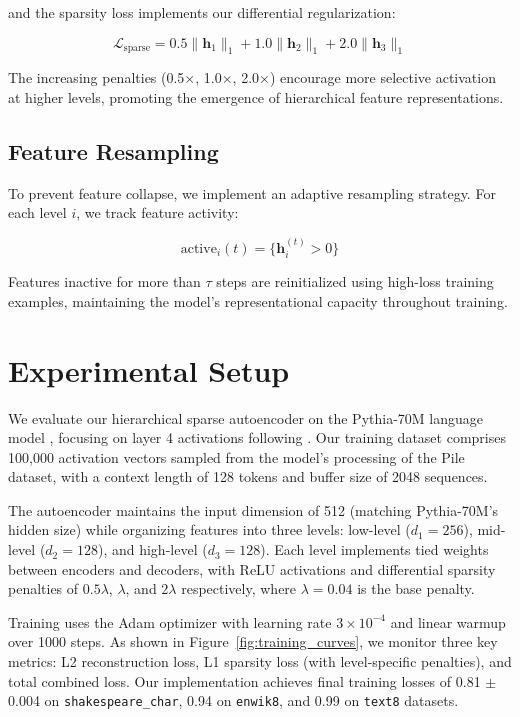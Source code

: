 and the sparsity loss implements our differential regularization:

\begin{equation}
\mathcal{L}_\text{sparse} = 0.5\|\mathbf{h}_1\|_1 + 1.0\|\mathbf{h}_2\|_1 + 2.0\|\mathbf{h}_3\|_1
\end{equation}

The increasing penalties (0.5×, 1.0×, 2.0×) encourage more selective activation at higher levels, promoting the emergence of hierarchical feature representations.

\subsection{Feature Resampling}
To prevent feature collapse, we implement an adaptive resampling strategy. For each level $i$, we track feature activity:

\begin{equation}
\text{active}_i(t) = \{\mathbf{h}_i^{(t)} > 0\}
\end{equation}

Features inactive for more than $\tau$ steps are reinitialized using high-loss training examples, maintaining the model's representational capacity throughout training.

\section{Experimental Setup}

We evaluate our hierarchical sparse autoencoder on the Pythia-70M language model \cite{elhage2022solu}, focusing on layer 4 activations following \citet{anthropic2022decomposition}. Our training dataset comprises 100,000 activation vectors sampled from the model's processing of the Pile dataset, with a context length of 128 tokens and buffer size of 2048 sequences.

The autoencoder maintains the input dimension of 512 (matching Pythia-70M's hidden size) while organizing features into three levels: low-level ($d_1=256$), mid-level ($d_2=128$), and high-level ($d_3=128$). Each level implements tied weights between encoders and decoders, with ReLU activations and differential sparsity penalties of $0.5\lambda$, $\lambda$, and $2\lambda$ respectively, where $\lambda=0.04$ is the base penalty.

Training uses the Adam optimizer with learning rate $3 \times 10^{-4}$ and linear warmup over 1000 steps. As shown in Figure~\ref{fig:training_curves}, we monitor three key metrics: L2 reconstruction loss, L1 sparsity loss (with level-specific penalties), and total combined loss. Our implementation achieves final training losses of 0.81 $\pm$ 0.004 on \texttt{shakespeare\_char}, 0.94 on \texttt{enwik8}, and 0.99 on \texttt{text8} datasets.

